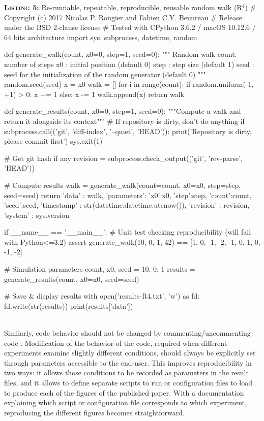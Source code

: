 \documentclass[a4paper,11pt]{article}
\begin{document}
\noindent \begin{minipage}[c]{\linewidth}
\begin{code}{\textbf{\textsc{Listing 5:}} Re-runnable, repeatable, reproducible, reusable random walk (R$^4$)}
# Copyright (c) 2017 Nicolas P. Rougier and Fabien C.Y. Benureau
# Release under the BSD 2-clause license
# Tested with CPython 3.6.2 / macOS 10.12.6 / 64 bits architecture
import sys, subprocess, datetime, random

def generate_walk(count, x0=0, step=1, seed=0):
    """ Random walk
        count: number of steps
        x0   : initial position (default 0)
        step : step size (default 1)
        seed : seed for the initialization of the random generator (default 0)
    """
    random.seed(seed)
    x = x0
    walk = []
    for i in range(count):
        if random.uniform(-1, +1) > 0:
            x += 1
        else:
            x -= 1
        walk.append(x)
    return walk

def generate_results(count, x0=0, step=1, seed=0):
    """Compute a walk and return it alongside its context"""
    # If repository is dirty, don't do anything
    if subprocess.call(('git', 'diff-index', '--quiet', 'HEAD')):
        print('Repository is dirty, please commit first')
        sys.exit(1)

    # Get git hash if any
    revision = subprocess.check_output(('git', 'rev-parse', 'HEAD'))

    # Compute results
    walk = generate_walk(count=count, x0=x0, step=step, seed=seed)
    return {'data'      : walk,
            'parameters': {'x0':x0, 'step':step, 'count':count, 'seed':seed},
            'timestamp' : str(datetime.datetime.utcnow()),
            'revision'  : revision,
            'system'    : sys.version}

if __name__ == '__main__':
    # Unit test checking reproducibility (will fail with Python<=3.2)
    assert generate_walk(10, 0, 1, 42) == [1, 0, -1, -2, -1, 0, 1, 0, -1, -2]

    # Simulation parameters
    count, x0, seed = 10, 0, 1
    results = generate_results(count, x0=x0, seed=seed)

    # Save & display results
    with open('results-R4.txt', 'w') as fd:
        fd.write(str(results))
    print(results['data'])
\end{code}
\end{minipage}\\

Similarly, code behavior should not be changed by commenting/uncommenting code \citep{Wilson:2017}. Modification of the behavior of the code, required when different experiments examine slightly different conditions, should always be explicitly set through parameters accessible to the end-user. This improves reproducibility in two ways: it allows those conditions to be recorded as parameters in the result files, and it allows to define separate scripts to run or configuration files to load to produce each of the figures of the published paper. With a documentation explaining which script or configuration file corresponds to which experiment, reproducing the different figures becomes straightforward.\\
\end{document}
